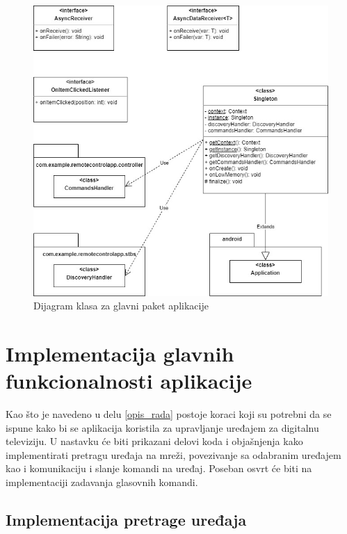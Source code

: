 \documentclass[implementacija.tex]{subfiles}
\begin{document}
\begin{figure}[!ht]
  \centering
  \includegraphics[width=\textwidth]{Implementacija/dijagrami/app_root_package.jpg}
  \caption{Dijagram klasa za glavni paket aplikacije}
  \label{fig:dijagramRoot}
\end{figure}

\section{Implementacija glavnih funkcionalnosti aplikacije}
Kao što je navedeno u delu \ref{opis_rada} postoje koraci koji su potrebni da se ispune kako bi se aplikacija koristila za upravljanje uređajem za digitalnu televiziju. U nastavku će biti prikazani delovi koda i objašnjenja kako implementirati pretragu uređaja na mreži, povezivanje sa odabranim uređajem kao i komunikaciju i slanje komandi na uređaj. Poseban osvrt će biti na implementaciji zadavanja glasovnih komandi. 

\subsection{Implementacija pretrage uređaja}

\end{document}
